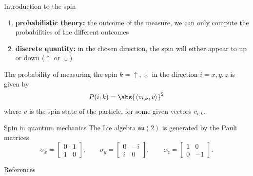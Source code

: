 \documentclass[8pt]{beamer}
\renewcommand{\emph}{\alert}
\begin{document}
{\begin{frame}{Introduction to the spin}
\begin{enumerate}
the direction in which we want to measure it
        \item \textbf{probabilistic theory:} the outcome of the measure, we can only compute the probabilities of the different outcomes
        \item \textbf{discrete quantity:} in the chosen direction, the spin will either appear to up or down ($\uparrow$ or $\downarrow$)
    \end{enumerate}
    The probability of measuring the spin $k=\uparrow,\downarrow$ in the direction $i=x,y,z$ is given by
    \begin{equation}
        P(i,k) = \abs{\langle v_{i,k},v \rangle}^2
    \end{equation}
    where $v$ is the spin state of the particle, for some given vectors $v_{i,k}$.

\end{frame}

\begin{frame}{Spin in quantum mechanics}
    The Lie algebra $\mathfrak{su}(2)$ is generated by the \emph{Pauli matrices}
    \begin{equation}
        \sigma_x =
        \begin{bmatrix}
            0 & 1\\
            1 & 0
        \end{bmatrix},\qquad
        \sigma_y =
        \begin{bmatrix}
            0 & -i\\
            i & 0
        \end{bmatrix},\qquad
        \sigma_z =
        \begin{bmatrix}
            1 & 0\\
            0 & -1
        \end{bmatrix}.
    \end{equation}
    
\end{frame}

}

\begin{frame}[allowframebreaks]{References}




\end{frame}
\end{document}
